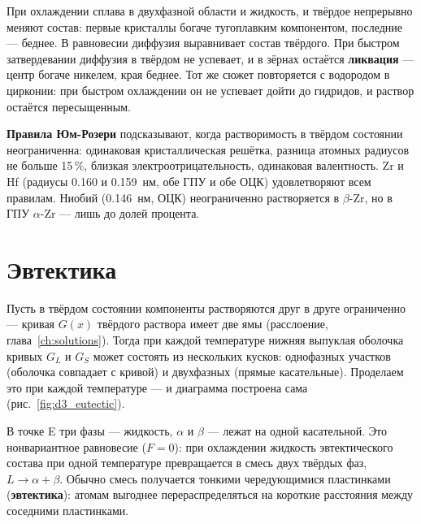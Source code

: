 \begin{idea}
При охлаждении сплава в двухфазной области и жидкость, и твёрдое непрерывно меняют состав: первые кристаллы
богаче тугоплавким компонентом, последние --- беднее. В равновесии диффузия выравнивает состав твёрдого. При
быстром затвердевании диффузия в твёрдом не успевает, и в зёрнах остаётся \textbf{ликвация} --- центр
богаче никелем, края беднее. Тот же сюжет повторяется с водородом в цирконии: при быстром охлаждении он не
успевает дойти до гидридов, и раствор остаётся пересыщенным.
\end{idea}

\textbf{Правила Юм-Розери} подсказывают, когда растворимость в твёрдом состоянии неограниченна: одинаковая
кристаллическая решётка, разница атомных радиусов не больше 15\,\%, близкая электроотрицательность, одинаковая
валентность. Zr и Hf (радиусы 0.160 и 0.159~нм, обе ГПУ и обе ОЦК) удовлетворяют всем правилам. Ниобий
(0.146~нм, ОЦК) неограниченно растворяется в $\beta$-Zr, но в ГПУ $\alpha$-Zr --- лишь до долей процента.

\section{Эвтектика}

Пусть в твёрдом состоянии компоненты растворяются друг в друге ограниченно --- кривая $G(x)$ твёрдого раствора
имеет две ямы (расслоение, глава~\ref{ch:solutions}). Тогда при каждой температуре нижняя выпуклая оболочка
кривых $G_L$ и $G_S$ может состоять из нескольких кусков: однофазных участков (оболочка совпадает с кривой) и
двухфазных (прямые касательные). Проделаем это при каждой температуре --- и диаграмма построена сама
(рис.~\ref{fig:d3_eutectic}).


В точке E три фазы --- жидкость, $\alpha$ и $\beta$ --- лежат на одной касательной. Это нонвариантное равновесие
($F = 0$): при охлаждении жидкость эвтектического состава при одной температуре превращается в смесь двух твёрдых
фаз, $L\to\alpha+\beta$. Обычно смесь получается тонкими чередующимися пластинками (\textbf{эвтектика}): атомам
выгоднее перераспределяться на короткие расстояния между соседними пластинками.

